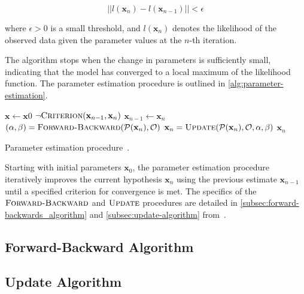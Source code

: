 \begin{equation}
    ||l(\textbf{x}_n) - l(\textbf{x}_{n-1})|| < \epsilon\label{eq:convergence-criterion}
\end{equation}

where $\epsilon > 0$ is a small threshold, and $l(\textbf{x}_n)$ denotes the likelihood of the observed data given the parameter values at the $n$-th iteration.

The algorithm stops when the change in parameters is sufficiently small, indicating that the model has converged to a local maximum of the likelihood function.
The parameter estimation procedure is outlined in \autoref{alg:parameter-estimation}.

\begin{algorithm}[htb!]
    \begin{codebox}
        \li $\mathbf{x} \gets \mathbf{x}0$
        \li \While $\neg\textnormal{\scshape Criterion}(\mathbf{x}_{n-1}, \mathbf{x}_n)$
        \li \Do $\mathbf{x}_{n - 1} \gets \mathbf{x}_n$
        \li $(\alpha, \beta) = \proc{Forward-Backward}(\mathcal{P}(\mathbf{x}_n), \mathcal{O})$
        \li $\mathbf{x}_n = \proc{Update}(\mathcal{P}(\mathbf{x}_n), \mathcal{O}, \alpha, \beta)$ \End
        \li \Return $\mathbf{x}_n$
    \end{codebox}
    \caption{Parameter estimation procedure~\cite{p7}.}
    \label{alg:parameter-estimation}
\end{algorithm}

Starting with initial parameters $\mathbf{x}_0$, the parameter estimation procedure iteratively improves the current hypothesis $\mathbf{x}_n$ using the previous estimate $\mathbf{x}_{n-1}$ until a specified criterion for convergence is met.
The specifics of the $\textnormal{\scshape Forward-Backward}$ and $\textnormal{\scshape Update}$ procedures are detailed in \autoref{subsec:forward-backwards_algorithm} and \autoref{subsec:update-algorithm} from~\cite{p7}.%

\subsection{Forward-Backward Algorithm}\label{subsec:forward-backwards_algorithm}


\subsection{Update Algorithm}\label{subsec:update-algorithm}

